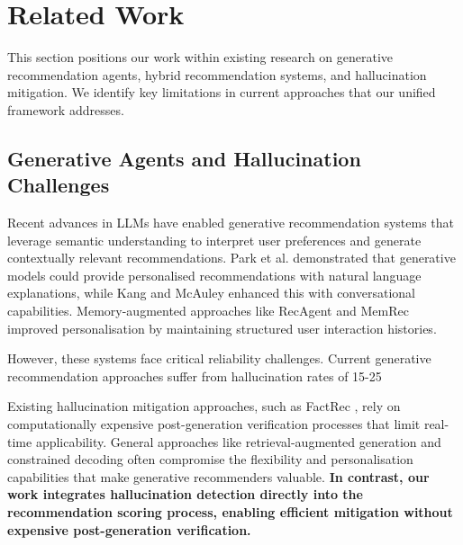 \documentclass[acmsmall]{acmart}
\begin{document}

\section{Related Work}

This section positions our work within existing research on generative recommendation agents, hybrid recommendation systems, and hallucination mitigation. We identify key limitations in current approaches that our unified framework addresses.

\subsection{Generative Agents and Hallucination Challenges}

Recent advances in LLMs have enabled generative recommendation systems that leverage semantic understanding to interpret user preferences and generate contextually relevant recommendations. Park et al. \cite{park2024llm} demonstrated that generative models could provide personalised recommendations with natural language explanations, while Kang and McAuley \cite{kang2023conversationalrec} enhanced this with conversational capabilities. Memory-augmented approaches like RecAgent \cite{mitchell2024recagent} and MemRec \cite{chen2024memrec} improved personalisation by maintaining structured user interaction histories.

However, these systems face critical reliability challenges. Current generative recommendation approaches suffer from hallucination rates of 15-25%

Existing hallucination mitigation approaches, such as FactRec \cite{li2024factrec}, rely on computationally expensive post-generation verification processes that limit real-time applicability. General approaches like retrieval-augmented generation \cite{lewis2020retrieval} and constrained decoding \cite{yang2024constrained} often compromise the flexibility and personalisation capabilities that make generative recommenders valuable. \textbf{In contrast, our work integrates hallucination detection directly into the recommendation scoring process, enabling efficient mitigation without expensive post-generation verification.}
\end{document}
